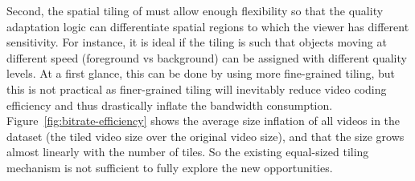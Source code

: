 Second, the spatial tiling of \vrvideos must allow enough flexibility so that the quality adaptation logic can differentiate spatial regions to which the viewer has different sensitivity. 
For instance, it is ideal if the tiling is such that objects moving at different speed (\eg foreground vs background) can be assigned with different quality levels.
At a first glance, this can be done by using more fine-grained tiling, but this is not practical as finer-grained tiling will inevitably reduce video  coding efficiency and thus drastically inflate the bandwidth consumption.
Figure~\ref{fig:bitrate-efficiency} shows the average size inflation of all videos in the dataset (the tiled video size over the original video size), and that the size grows almost linearly with the number of tiles. 
So the existing equal-sized tiling mechanism is not sufficient to fully explore the new opportunities.

%
%
%
%

